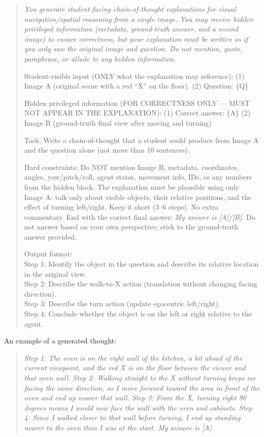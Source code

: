 \begin{quote}\small\itshape
You generate student-facing chain-of-thought explanations for visual navigation/spatial reasoning from a single image. You may receive hidden privileged information (metadata, ground-truth answer, and a second image) to ensure correctness, but your explanation must be written as if you only saw the original image and question. Do not mention, quote, paraphrase, or allude to any hidden information.
 
\smallskip
\noindent Student-visible input (ONLY what the explanation may reference):
(1) Image A (original scene with a red ``X'' on the floor).
(2) Question: \{Q\}
 
\noindent Hidden privileged information (FOR CORRECTNESS ONLY --- MUST NOT APPEAR IN THE EXPLANATION):
(1) Correct answer: \{A\}
(2) Image B (ground-truth final view after moving and turning)
 
\smallskip
\noindent Task: Write a chain-of-thought that a student could produce from Image A and the question alone (not more than 10 sentences).
 
\noindent Hard constraints: Do NOT mention Image B, metadata, coordinates, angles, yaw/pitch/roll, agent states, movement info, IDs, or any numbers from the hidden block. The explanation must be plausible using only Image A: talk only about visible objects, their relative positions, and the effect of turning left/right. Keep it short (3--6 steps). No extra commentary. End with the correct final answer: \emph{My answer is [A]/[B].} Do not answer based on your own perspective; stick to the ground-truth answer provided.
 
\smallskip
\noindent Output format:\\
Step 1: Identify the object in the question and describe its relative location in the original view.\\
Step 2: Describe the walk-to-X action (translation without changing facing direction).\\
Step 3: Describe the turn action (update egocentric left/right).\\
Step 4: Conclude whether the object is on the left or right relative to the agent.
\end{quote}
 
\noindent An example of a generated thought:
\begin{quote}\small\itshape
Step 1: The oven is on the right wall of the kitchen, a bit ahead of the current viewpoint, and the red X is on the floor between the viewer and that oven wall.
Step 2: Walking straight to the X without turning keeps me facing the same direction, so I move forward toward the area in front of the oven and end up nearer that wall.
Step 3: From the X, turning right 90 degrees means I would now face the wall with the oven and cabinets.
Step 4: Since I walked closer to that wall before turning, I end up standing nearer to the oven than I was at the start.
My answer is [A].
\end{quote}
 
